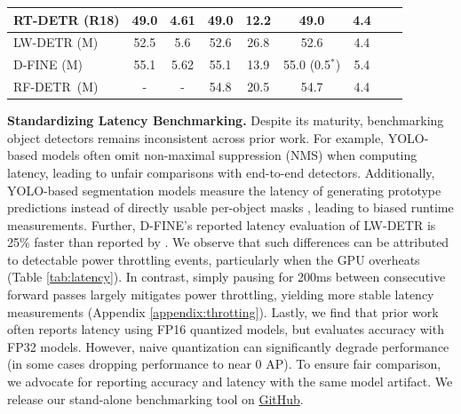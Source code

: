 \documentclass{article} %
\newcommand{\method}{RF-DETR}
\begin{document}
{\begin{table}[t]
{\begin{tabular}{|l|cc|cc|cc|cc|}
RT-DETR (R18)                                                 & \multicolumn{1}{c|}{49.0}       &       4.61   & \multicolumn{1}{c|}{49.0}            &        12.2      & \multicolumn{1}{c|}{49.0}         &  4.4   \\ \hline
LW-DETR (M)                                                 & \multicolumn{1}{c|}{52.5}       &       5.6   & \multicolumn{1}{c|}{52.6}            &        26.8      & \multicolumn{1}{c|}{52.6}         &  4.4   \\ \hline
D-FINE (M)                                                  & \multicolumn{1}{c|}{55.1}       &       5.62   & \multicolumn{1}{c|}{55.1}            &       13.9       & \multicolumn{1}{c|}{55.0 (0.5$^*$)}         &   5.4   \\ \hline
\method \ (M)                                                 & \multicolumn{1}{c|}{-}       &       -   & \multicolumn{1}{c|}{54.8}            &       20.5      & \multicolumn{1}{c|}{54.7}         &   4.4   \\ \hline
\end{tabular}
}
\end{table}
}

\textbf{Standardizing Latency Benchmarking.} Despite its maturity, benchmarking object detectors remains inconsistent across prior work. For example, YOLO-based models often omit non-maximal suppression (NMS) when computing latency, leading to unfair comparisons with end-to-end detectors. Additionally, YOLO-based segmentation models measure the latency of generating prototype predictions instead of directly usable per-object masks \citep{yolov11}, leading to biased runtime measurements. Further, D-FINE's reported latency evaluation of LW-DETR is 25\% faster than reported by \cite{chen2024lwdetr}. We observe that such differences can be attributed to detectable power throttling events, particularly when the GPU overheats (Table \ref{tab:latency}). In contrast, simply pausing for 200ms between consecutive forward passes largely mitigates power throttling, yielding more stable latency measurements (Appendix \ref{appendix:throtting}). Lastly, we find that prior work often reports latency using FP16 quantized models, but evaluates accuracy with FP32 models. However, naive quantization can significantly degrade performance (in some cases dropping performance to near 0 AP). To ensure fair comparison, we advocate for reporting accuracy and latency with the same model artifact.  We release our stand-alone benchmarking tool on \href{https://github.com/roboflow/single_artifact_benchmarking}{GitHub}. 
\end{document}

